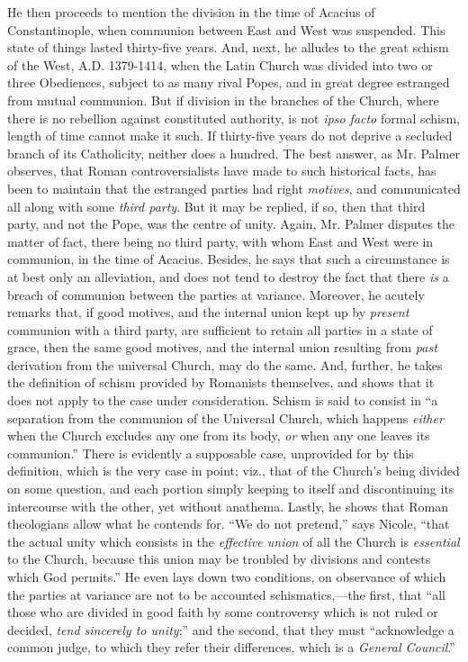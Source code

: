 He then proceeds to mention the division in the
time of Acacius of Constantinople, when communion between East and
West was suspended. This state of things lasted thirty-five years.
And, next, he alludes to the great schism of the West, A.D.
1379-1414, when the Latin Church was divided into two or three
Obediences, subject to as many rival Popes, and in great degree
estranged from mutual communion. But if division in the branches of
the Church, where there is no rebellion against constituted
authority, is not \emph{ipso facto} formal schism, length of time
cannot make it such. If thirty-five years do not deprive a secluded
branch of its Catholicity, neither does a hundred. The best answer, as
Mr. Palmer observes, that Roman controversialists have made to such
historical facts, has been to maintain that the estranged parties had
right \emph{motives}, and communicated all along with some \emph{third
party}. But it may be replied, if so, then that third party, and
not the Pope, was the centre of unity. Again, Mr. Palmer disputes the
matter of fact, there being no third party, with whom East and West
were in communion, in the time of Acacius. Besides, he says that such
a circumstance is at best only an alleviation, and does not tend to
destroy the fact that there \emph{is} a breach of communion between
the parties at variance. Moreover, he acutely remarks that, if good
motives, and the internal union kept up by \emph{present} communion
with a third party, are sufficient to retain all parties in a state of
grace, then the same good motives, and the internal union resulting
from \emph{past} derivation from the universal Church, may do the
same. And, further, he takes the definition of schism provided by
Romanists themselves, and shows that it does not apply to the case
under consideration. Schism is said to consist in ``a separation from
the communion of the Universal Church, which happens \emph{either}
when the Church excludes any one from its body, \emph{or} when any one
leaves its communion.'' There is evidently a supposable case,
unprovided for by this definition, which is the very case in point;
viz., that of the Church's being divided on some question, and each
portion simply keeping to itself and discontinuing its intercourse
with the other, yet without anathema. Lastly, he shows that Roman
theologians allow what he contends for. ``We do not pretend,'' says Nicole, ``that the actual unity which consists in the \emph{effective
union} of all the Church is \emph{essential} to the Church, because this
union may be troubled by divisions and contests which God permits.'' He
even lays down two conditions, on observance of which the parties at
variance are not to be accounted schismatics,—the first, that ``all
those who are divided in good faith by some controversy which is not
ruled or decided, \emph{tend sincerely to unity};'' and the second,
that they must ``acknowledge a common judge, to which they refer their
differences, which is a \emph{General Council}.''

